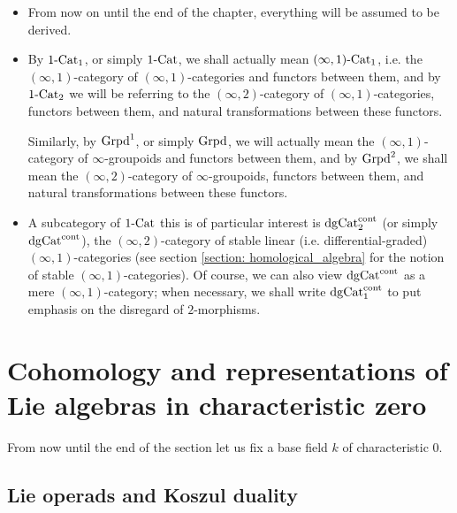     \begin{convention} \label{conv: formal_geometry_everything_is_derived}
        \noindent
        \begin{itemize}
            \item From now on until the end of the chapter, everything will be assumed to be derived. 
            \item By $1\text{-}\mathrm{Cat}_1$, or simply $1\text{-}\mathrm{Cat}$, we shall actually mean $(\infty, 1)\text{-}\mathrm{Cat}_1$, i.e. the $(\infty, 1)$-category of $(\infty, 1)$-categories and functors between them, and by $1\text{-}\mathrm{Cat}_2$ we will be referring to the $(\infty, 2)$-category of $(\infty, 1)$-categories, functors between them, and natural transformations between these functors. 
            
            Similarly, by $\mathrm{Grpd}^1$, or simply $\mathrm{Grpd}$, we will actually mean the $(\infty, 1)$-category of $\infty$-groupoids and functors between them, and by $\mathrm{Grpd}^2$, we shall mean the $(\infty, 2)$-category of $\infty$-groupoids, functors between them, and natural transformations between these functors.
            \item A subcategory of $1\text{-}\mathrm{Cat}$ this is of particular interest is $\mathrm{dg}\mathrm{Cat}^{\mathrm{cont}}_2$ (or simply $\mathrm{dg}\mathrm{Cat}^{\mathrm{cont}}$), the $(\infty, 2)$-category of stable linear (i.e. differential-graded) $(\infty, 1)$-categories (see section \ref{section: homological_algebra} for the notion of stable $(\infty, 1)$-categories). Of course, we can also view $\mathrm{dg}\mathrm{Cat}^{\mathrm{cont}}$ as a mere $(\infty, 1)$-category; when necessary, we shall write $\mathrm{dg}\mathrm{Cat}^{\mathrm{cont}}_1$ to put emphasis on the disregard of $2$-morphisms.
        \end{itemize} 
    \end{convention}
    
    \section{Cohomology and representations of Lie algebras in characteristic zero}
        \begin{convention}
            From now until the end of the section let us fix a base field $k$ of characteristic $0$.
        \end{convention}
                
        \subsection{Lie operads and Koszul duality}

